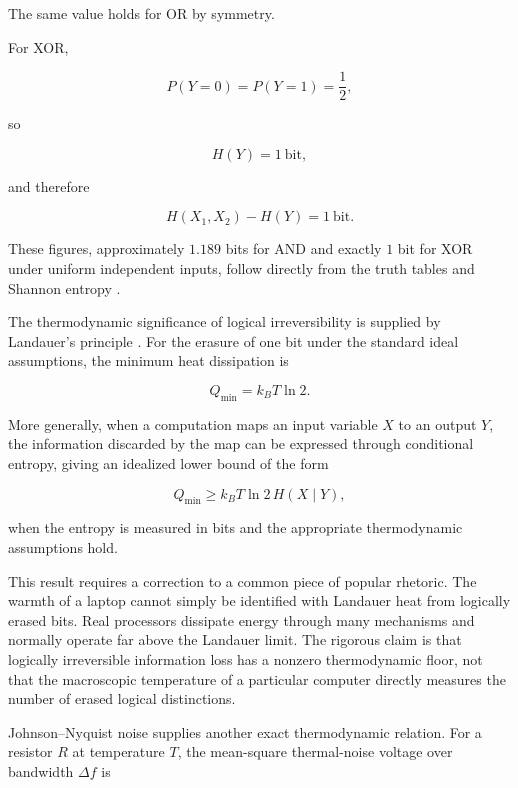 \documentclass[11pt]{article}
\begin{document}
The same value holds for OR by symmetry.

For XOR,

\begin{equation}
P(Y=0)=P(Y=1)=\frac12,
\end{equation}

so

\begin{equation}
H(Y)=1\ \text{bit},
\end{equation}

and therefore

\begin{equation}
H(X_1,X_2)-H(Y)=1\ \text{bit}.
\end{equation}

These figures, approximately $1.189$ bits for AND and exactly $1$ bit for XOR under uniform independent inputs, follow directly from the truth tables and Shannon entropy \citep{Shannon1948}.

The thermodynamic significance of logical irreversibility is supplied by Landauer's principle \citep{Landauer1961}. For the erasure of one bit under the standard ideal assumptions, the minimum heat dissipation is

\begin{equation}
Q_{\min}
=
k_BT\ln2.
\end{equation}

More generally, when a computation maps an input variable $X$ to an output $Y$, the information discarded by the map can be expressed through conditional entropy, giving an idealized lower bound of the form

\begin{equation}
Q_{\min}
\geq
k_BT\ln2\,H(X\mid Y),
\end{equation}

when the entropy is measured in bits and the appropriate thermodynamic assumptions hold.

This result requires a correction to a common piece of popular rhetoric. The warmth of a laptop cannot simply be identified with Landauer heat from logically erased bits. Real processors dissipate energy through many mechanisms and normally operate far above the Landauer limit. The rigorous claim is that logically irreversible information loss has a nonzero thermodynamic floor, not that the macroscopic temperature of a particular computer directly measures the number of erased logical distinctions.

Johnson--Nyquist noise \citep{Johnson1928,Nyquist1928} supplies another exact thermodynamic relation. For a resistor $R$ at temperature $T$, the mean-square thermal-noise voltage over bandwidth $\Delta f$ is
\end{document}
